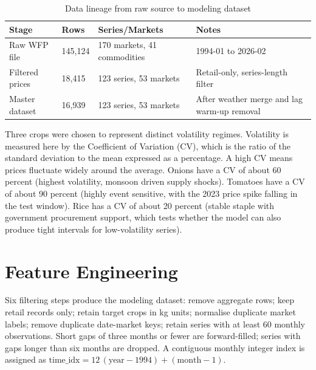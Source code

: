 \documentclass[12pt,a4paper]{report}
\begin{document}
\begin{table}[H]
\centering
\caption{Data lineage from raw source to modeling dataset}
\label{tab:ch4_data_audit}
\small
\begin{tabularx}{\textwidth}{L{0.26\textwidth}L{0.20\textwidth}L{0.20\textwidth}X}
\toprule
\textbf{Stage} & \textbf{Rows} & \textbf{Series/Markets} & \textbf{Notes} \\
\midrule
Raw WFP file & 145,124 & 170 markets, 41 commodities & 1994-01 to 2026-02 \\
Filtered prices & 18,415 & 123 series, 53 markets & Retail-only, series-length filter \\
Master dataset & 16,939 & 123 series, 53 markets & After weather merge and lag warm-up removal \\
\bottomrule
\end{tabularx}
\end{table}

Three crops were chosen to represent distinct volatility regimes. Volatility is measured
here by the Coefficient of Variation (CV), which is the ratio of the standard deviation to
the mean expressed as a percentage. A high CV means prices fluctuate widely around the
average. Onions have a CV of about 60 percent (highest volatility, monsoon driven supply
shocks). Tomatoes have a CV of about 90 percent (highly event sensitive, with the 2023
price spike falling in the test window). Rice has a CV of about 20 percent (stable staple
with government procurement support, which tests whether the model can also produce tight
intervals for low-volatility series).

\section{Feature Engineering}

Six filtering steps produce the modeling dataset: remove aggregate rows; keep retail records
only; retain target crops in kg units; normalise duplicate market labels; remove
duplicate date-market keys; retain series with at least 60 monthly observations. Short gaps
of three months or fewer are forward-filled; series with gaps longer than six months are
dropped. A contiguous monthly integer index is assigned as
$\text{time\_idx} = 12\,(\text{year}-1994) + (\text{month}-1)$.
\end{document}
